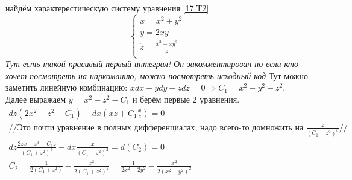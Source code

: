 \documentclass{article}
\begin{document}
найдём характерестическую систему уравнения \ref{17.T2}.
\begin{equation*}
    \begin{cases}
        \dot x =x^2+y^2 \\
        \dot y = 2xy\\
        \dot z = \frac{x^3-xy^2}{z}\\
    \end{cases}
\end{equation*}
 \textcolor[rgb]{0.480469,0.566406,0.480469}{\textit{Тут есть такой красивый первый интеграл! Он закомментирован но если кто хочет посмотреть на наркоманию, можно посмотреть исходный код}}                                                                                          
 Тут можно заметить линейную комбинацию: $x dx  - y dy - z dz =0 \Rightarrow C_1 =  x^2-y^2-z^2$. Далее выражаем $y=x^2-z^2-C_1$ и берём первые 2 уравнения.
 \begin{gather*}
     dz(2x^2-z^2-C_1)-dx\left(xz+C_1 \frac{x}{z} \right)=0\\
     //\text{Это почти уравнение в полных дифференциалах, надо всего-то домножить на } \frac{z}{(C_1+z^2)^3}//\\
     dz \frac{2zx-z^3-C_1z}{(C_1+z^2)^3} - dx \frac{x}{(C_1+z^2)^2}=d(C_2)=0\\
     C_2=\frac{1}{2 \left(C_1+z^2\right)}-\frac{x^2}{2 \left(C_1+z^2\right)^2} = \frac{1}{2x^2-2y^2} - \frac{x^2}{2 \left(x^2-y^2\right)^2}
 \end{gather*}
\end{document}
